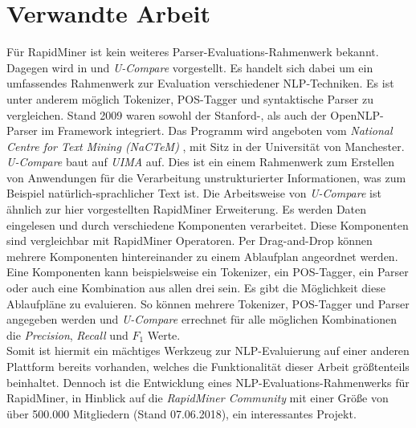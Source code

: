 %
\chapter{Verwandte Arbeit}
\label{sec:related}

Für RapidMiner ist kein weiteres Parser-Evaluations-Rahmenwerk bekannt. Dagegen wird in \cite{ucompare1} und \cite{ucompare2} \textit{U-Compare} vorgestellt. Es handelt sich dabei um ein umfassendes Rahmenwerk zur Evaluation verschiedener NLP-Techniken. Es ist unter anderem möglich Tokenizer, POS-Tagger und syntaktische Parser zu vergleichen. Stand 2009 waren sowohl der Stanford-, als auch der OpenNLP-Parser im Framework integriert. Das Programm wird angeboten vom \textit{National Centre for Text Mining (NaCTeM)} \cite{nactem}, mit Sitz in der Universität von Manchester.\\
\textit{U-Compare} baut auf \textit{UIMA} \cite{uima} auf. Dies ist ein einem Rahmenwerk zum Erstellen von Anwendungen für die Verarbeitung unstrukturierter Informationen, was zum Beispiel natürlich-sprachlicher Text ist. Die Arbeitsweise von \textit{U-Compare} ist ähnlich zur hier vorgestellten RapidMiner Erweiterung. Es werden Daten eingelesen und durch verschiedene Komponenten verarbeitet. Diese Komponenten sind vergleichbar mit RapidMiner Operatoren. Per Drag-and-Drop können mehrere Komponenten hintereinander zu einem Ablaufplan angeordnet werden. Eine Komponenten kann beispielsweise ein Tokenizer, ein POS-Tagger, ein Parser oder auch eine Kombination aus allen drei sein. Es gibt die Möglichkeit diese Ablaufpläne zu evaluieren. So können mehrere Tokenizer, POS-Tagger und Parser angegeben werden und \textit{U-Compare} errechnet für alle möglichen Kombinationen die \textit{Precision}, \textit{Recall} und \(F_1\) Werte. \cite{ucompare2} \cite{ucompareeval} \\
Somit ist hiermit ein mächtiges Werkzeug zur NLP-Evaluierung auf einer anderen Plattform bereits vorhanden, welches die Funktionalität dieser Arbeit größtenteils beinhaltet. Dennoch ist die Entwicklung eines NLP-Evaluations-Rahmenwerks für RapidMiner, in Hinblick auf die \textit{RapidMiner Community} mit einer Größe von über 500.000 Mitgliedern (Stand 07.06.2018), ein interessantes Projekt. %